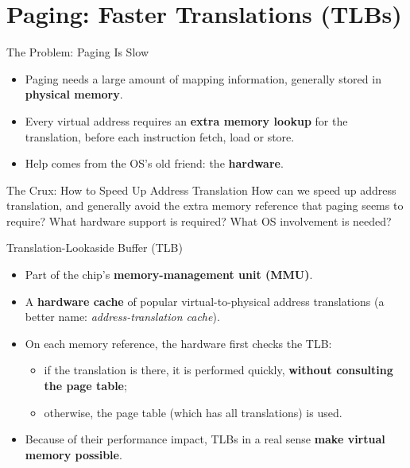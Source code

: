 \section{Paging: Faster Translations (TLBs)}

\begin{frame}{The Problem: Paging Is Slow}

\begin{itemize}
    \item Paging needs a large amount of mapping information,
          generally stored in \textbf{physical memory}.
    \item Every virtual address requires an \textbf{extra memory lookup}
          for the translation, before each instruction fetch, load or store.
    \item Help comes from the OS's old friend: the \textbf{hardware}.
\end{itemize}

\begin{block}{The Crux: How to Speed Up Address Translation}
How can we speed up address translation, and generally avoid the extra
memory reference that paging seems to require? What hardware support is
required? What OS involvement is needed?
\end{block}

\end{frame}

\begin{frame}{Translation-Lookaside Buffer (TLB)}

\begin{itemize}
    \item Part of the chip's \textbf{memory-management unit (MMU)}.
    \item A \textbf{hardware cache} of popular virtual-to-physical
          address translations (a better name: \textit{address-translation cache}).
    \item On each memory reference, the hardware first checks the TLB:
    \begin{itemize}
        \item if the translation is there, it is performed quickly,
              \textbf{without consulting the page table};
        \item otherwise, the page table (which has all translations) is used.
    \end{itemize}
    \item Because of their performance impact, TLBs in a real sense
          \textbf{make virtual memory possible}.
\end{itemize}

\end{frame}

